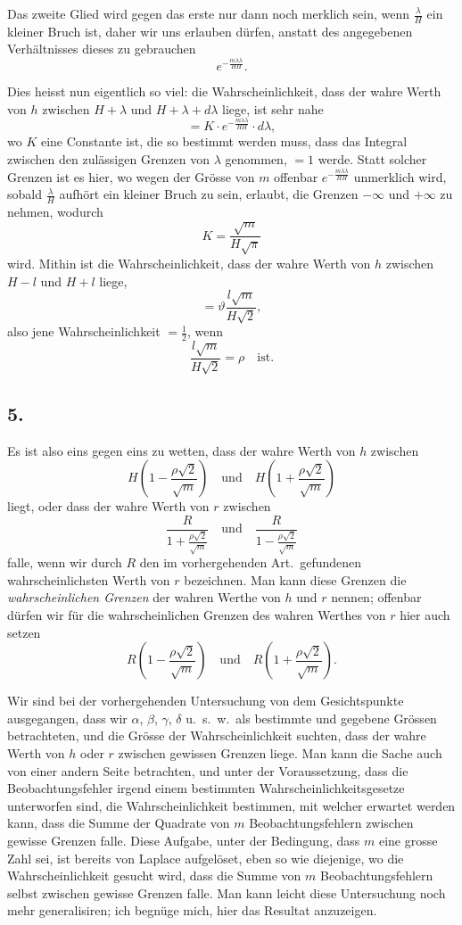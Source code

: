 \documentclass[12pt,a4paper]{article}
\begin{document}
Das zweite Glied wird gegen das erste nur dann noch merklich sein, wenn $\frac{\lambda}{H}$ ein kleiner Bruch ist, daher wir uns erlauben d\"urfen, anstatt des angegebenen Verh\"altnisses dieses zu gebrauchen
\[
e^{-\frac{m\lambda\lambda}{HH}}.
\]

Dies heisst nun eigentlich so viel: die Wahrscheinlichkeit, dass der wahre Werth von $h$ zwischen $H + \lambda$ und $H + \lambda + d\lambda$ liege, ist sehr nahe
\[
= K \cdot e^{-\frac{m\lambda\lambda}{HH}} \cdot d\lambda,
\]
wo $K$ eine Constante ist, die so bestimmt werden muss, dass das Integral zwischen den zul\"assigen Grenzen von $\lambda$ genommen, $= 1$ werde. Statt solcher Grenzen ist es hier, wo wegen der Gr\"osse von $m$ offenbar $e^{-\frac{m\lambda\lambda}{HH}}$ unmerklich wird, sobald $\frac{\lambda}{H}$ aufh\"ort ein kleiner Bruch zu sein, erlaubt, die Grenzen $-\infty$ und $+\infty$ zu nehmen, wodurch
\[
K = \frac{\sqrt{m}}{H\sqrt{\pi}}
\]
wird. Mithin ist die Wahrscheinlichkeit, dass der wahre Werth von $h$ zwischen $H - l$ und $H + l$ liege,
\[
= \vartheta\frac{l\sqrt{m}}{H\sqrt{2}},
\]
also jene Wahrscheinlichkeit $= \frac{1}{2}$, wenn
\[
\frac{l\sqrt{m}}{H\sqrt{2}} = \rho \quad\text{ist.}
\]

\subsection*{5.}

Es ist also eins gegen eins zu wetten, dass der wahre Werth von $h$ zwischen
\[
H\left(1 - \frac{\rho\sqrt{2}}{\sqrt{m}}\right) \quad\text{und}\quad H\left(1 + \frac{\rho\sqrt{2}}{\sqrt{m}}\right)
\]
liegt, oder dass der wahre Werth von $r$ zwischen
\[
\frac{R}{1 + \frac{\rho\sqrt{2}}{\sqrt{m}}} \quad\text{und}\quad \frac{R}{1 - \frac{\rho\sqrt{2}}{\sqrt{m}}}
\]
falle, wenn wir durch $R$ den im vorhergehenden Art.\ gefundenen wahrscheinlichsten Werth von $r$ bezeichnen. Man kann diese Grenzen die \textit{wahrscheinlichen Grenzen} der wahren Werthe von $h$ und $r$ nennen; offenbar d\"urfen wir f\"ur die wahrscheinlichen Grenzen des wahren Werthes von $r$ hier auch setzen
\[
R\left(1 - \frac{\rho\sqrt{2}}{\sqrt{m}}\right) \quad\text{und}\quad R\left(1 + \frac{\rho\sqrt{2}}{\sqrt{m}}\right).
\]

Wir sind bei der vorhergehenden Untersuchung von dem Gesichtspunkte ausgegangen, dass wir $\alpha$, $\beta$, $\gamma$, $\delta$ u.\ s.\ w.\ als bestimmte und gegebene Gr\"ossen betrachteten, und die Gr\"osse der Wahrscheinlichkeit suchten, dass der wahre Werth von $h$ oder $r$ zwischen gewissen Grenzen liege. Man kann die Sache auch von einer andern Seite betrachten, und unter der Voraussetzung, dass die Beobachtungsfehler irgend einem bestimmten Wahrscheinlichkeitsgesetze unterworfen sind, die Wahrscheinlichkeit bestimmen, mit welcher erwartet werden kann, dass die Summe der Quadrate von $m$ Beobachtungsfehlern zwischen gewisse Grenzen falle. Diese Aufgabe, unter der Bedingung, dass $m$ eine grosse Zahl sei, ist bereits von Laplace aufgel\"oset, eben so wie diejenige, wo die Wahrscheinlichkeit gesucht wird, dass die Summe von $m$ Beobachtungsfehlern selbst zwischen gewisse Grenzen falle. Man kann leicht diese Untersuchung noch mehr generalisiren; ich begn\"uge mich, hier das Resultat anzuzeigen.
\end{document}
